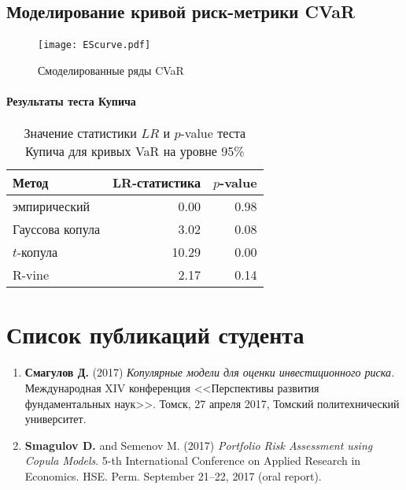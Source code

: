 \documentclass[aspectratio=169]{beamer}
\begin{document}
\subsection{Моделирование кривой риск-метрики CVaR}
\begin{frame}{\insertsection}
    \framesubtitle{\insertsubsection}
    \begin{figure}
        \centering
        \texttt{[image: EScurve.pdf]}
        \caption{Смоделированные ряды CVaR}
    \end{figure}
\end{frame}

\begin{frame}{\insertsection}
    \framesubtitle{Результаты теста Купича}
    \begin{table}
        \centering
        \caption{Значение статистики $LR$ и $p$-value теста Купича для кривых VaR на уровне 95\%}
        \label{tab:kupiec}
        \setlength{\tabcolsep}{10pt}
        \begin{tabular}{lrr} \toprule
            Метод & LR-статистика & $p$-value \\ \midrule
            эмпирический & 0.00 & 0.98 \\
            Гауссова копула & 3.02 & 0.08 \\
            $t$-копула & 10.29 & 0.00 \\
            R-vine & 2.17 & 0.14 \\ \bottomrule
        \end{tabular}
    \end{table}
\end{frame}

\section{Список публикаций студента}

\begin{frame}{{}}
    \framesubtitle{\insertsection}
    \begin{enumerate}
        \item \textbf{Смагулов Д.} (2017) \textit{Копулярные модели для оценки инвестиционного риска.} Международная XIV конференция <<Перспективы развития фундаментальных наук>>. Томск, 27 апреля 2017, Томский политехнический университет.
        \item \textbf{Smagulov D.} and Semenov M. (2017) \textit{Portfolio Risk Assessment using Copula Models}. 5-th International Conference on Applied Research in Economics. HSE. Perm.  September 21–22, 2017 (oral report).
    \end{enumerate}
\end{frame}
\end{document}
